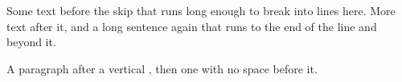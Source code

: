 \documentclass{article}
\begin{document}
Some text before the skip that runs long enough to break into lines here. \medskip More text after it, and a long sentence again that runs to the end of the line and beyond it.

\medskip
A paragraph after a vertical \medskip, then\medskip{} one with no space before it.
\end{document}
